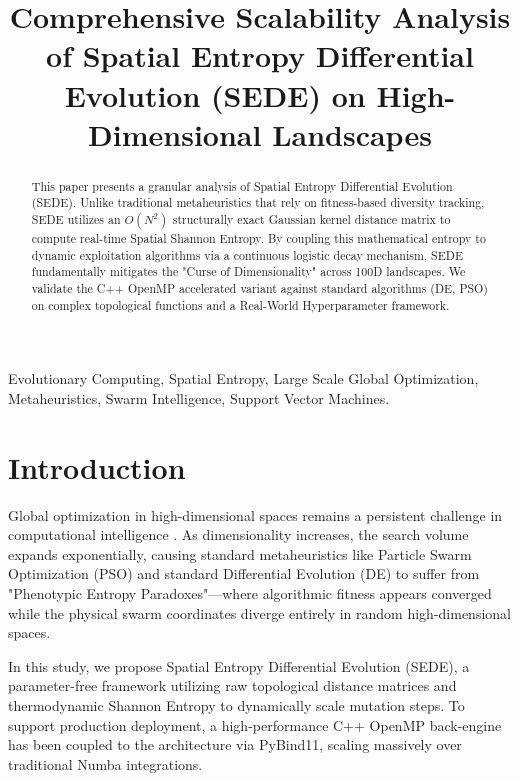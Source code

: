 \documentclass[conference]{IEEEtran}
\begin{document}
\title{Comprehensive Scalability Analysis of Spatial Entropy Differential Evolution (SEDE) on High-Dimensional Landscapes}

\author{
}

\maketitle

\begin{abstract}
This paper presents a granular analysis of Spatial Entropy Differential Evolution (SEDE). Unlike traditional metaheuristics that rely on fitness-based diversity tracking, SEDE utilizes an $O(N^2)$ structurally exact Gaussian kernel distance matrix to compute real-time Spatial Shannon Entropy. By coupling this mathematical entropy to dynamic exploitation algorithms via a continuous logistic decay mechanism, SEDE fundamentally mitigates the "Curse of Dimensionality" across 100D landscapes. We validate the C++ OpenMP accelerated variant against standard algorithms (DE, PSO) on complex topological functions and a Real-World Hyperparameter framework.
\end{abstract}

\begin{IEEEkeywords}
Evolutionary Computing, Spatial Entropy, Large Scale Global Optimization, Metaheuristics, Swarm Intelligence, Support Vector Machines.
\end{IEEEkeywords}

\section{Introduction}
Global optimization in high-dimensional spaces remains a persistent challenge in computational intelligence \cite{b1}. As dimensionality increases, the search volume expands exponentially, causing standard metaheuristics like Particle Swarm Optimization (PSO) \cite{b2} and standard Differential Evolution (DE) \cite{b7} to suffer from "Phenotypic Entropy Paradoxes"—where algorithmic fitness appears converged while the physical swarm coordinates diverge entirely in random high-dimensional spaces.

In this study, we propose Spatial Entropy Differential Evolution (SEDE), a parameter-free framework utilizing raw topological distance matrices and thermodynamic Shannon Entropy to dynamically scale mutation steps. To support production deployment, a high-performance C++ OpenMP back-engine has been coupled to the architecture via PyBind11, scaling massively over traditional Numba integrations.
\end{document}
